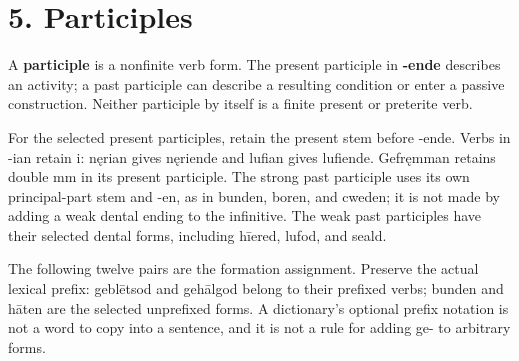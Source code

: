 \section*{5. Participles}

A \textbf{participle} is a nonfinite verb form. The present participle in \textbf{-ende} describes an activity; a past participle can describe a resulting condition or enter a passive construction. Neither participle by itself is a finite present or preterite verb.

For the selected present participles, retain the present stem before -ende. Verbs in -ian retain i: nęrian gives nęriende and lufian gives lufiende. Gefręmman retains double mm in its present participle. The strong past participle uses its own principal-part stem and -en, as in bunden, boren, and cweden; it is not made by adding a weak dental ending to the infinitive. The weak past participles have their selected dental forms, including hīered, lufod, and seald.

The following twelve pairs are the formation assignment. Preserve the actual lexical prefix: geblētsod and gehālgod belong to their prefixed verbs; bunden and hāten are the selected unprefixed forms. A dictionary’s optional prefix notation is not a word to copy into a sentence, and it is not a rule for adding ge- to arbitrary forms.


